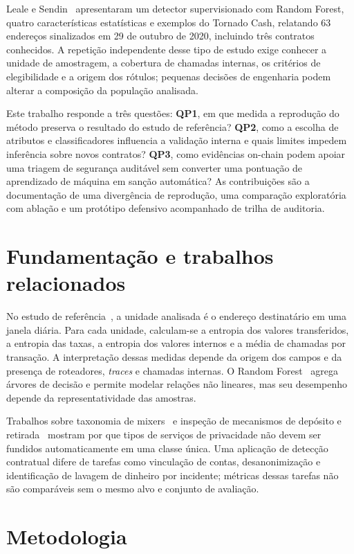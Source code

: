\documentclass[12pt]{article}
\begin{document}
Leale e Sendin~\cite{leale2025} apresentaram um detector supervisionado com Random Forest, quatro características estatísticas e exemplos do Tornado Cash, relatando 63 endereços sinalizados em 29 de outubro de 2020, incluindo três contratos conhecidos. A repetição independente desse tipo de estudo exige conhecer a unidade de amostragem, a cobertura de chamadas internas, os critérios de elegibilidade e a origem dos rótulos; pequenas decisões de engenharia podem alterar a composição da população analisada.

Este trabalho responde a três questões: \textbf{QP1}, em que medida a reprodução do método preserva o resultado do estudo de referência? \textbf{QP2}, como a escolha de atributos e classificadores influencia a validação interna e quais limites impedem inferência sobre novos contratos? \textbf{QP3}, como evidências on-chain podem apoiar uma triagem de segurança auditável sem converter uma pontuação de aprendizado de máquina em sanção automática? As contribuições são a documentação de uma divergência de reprodução, uma comparação exploratória com ablação e um protótipo defensivo acompanhado de trilha de auditoria.

\section{Fundamentação e trabalhos relacionados}
No estudo de referência~\cite{leale2025}, a unidade analisada é o endereço destinatário em uma janela diária. Para cada unidade, calculam-se a entropia dos valores transferidos, a entropia das taxas, a entropia dos valores internos e a média de chamadas por transação. A interpretação dessas medidas depende da origem dos campos e da presença de roteadores, \emph{traces} e chamadas internas. O Random Forest~\cite{breiman2001} agrega árvores de decisão e permite modelar relações não lineares, mas seu desempenho depende da representatividade das amostras.

Trabalhos sobre taxonomia de mixers~\cite{barbereau2023} e inspeção de mecanismos de depósito e retirada~\cite{akopova2024} mostram por que tipos de serviços de privacidade não devem ser fundidos automaticamente em uma classe única. Uma aplicação de detecção contratual difere de tarefas como vinculação de contas, desanonimização e identificação de lavagem de dinheiro por incidente; métricas dessas tarefas não são comparáveis sem o mesmo alvo e conjunto de avaliação.

\section{Metodologia}
\end{document}
